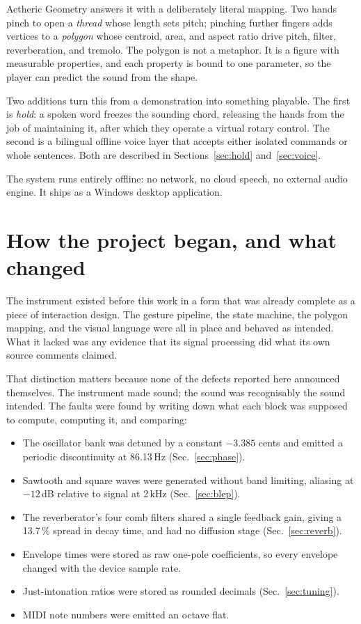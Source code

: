 \documentclass[a4paper,11pt]{article}
\begin{document}
Aetheric Geometry answers it with a deliberately literal mapping. Two hands
pinch to open a \emph{thread} whose length sets pitch; pinching further fingers
adds vertices to a \emph{polygon} whose centroid, area, and aspect ratio drive
pitch, filter, reverberation, and tremolo. The polygon is not a metaphor. It
is a figure with measurable properties, and each property is bound to one
parameter, so the player can predict the sound from the shape.

Two additions turn this from a demonstration into something playable. The first
is \emph{hold}: a spoken word freezes the sounding chord, releasing the hands
from the job of maintaining it, after which they operate a virtual rotary
control. The second is a bilingual offline voice layer that accepts either
isolated commands or whole sentences. Both are described in
Sections~\ref{sec:hold} and~\ref{sec:voice}.

The system runs entirely offline: no network, no cloud speech, no external
audio engine. It ships as a Windows desktop application.

\section{How the project began, and what changed}

The instrument existed before this work in a form that was already complete as
a piece of interaction design. The gesture pipeline, the state machine, the
polygon mapping, and the visual language were all in place and behaved as
intended. What it lacked was any evidence that its signal processing did what
its own source comments claimed.

That distinction matters because none of the defects reported here announced
themselves. The instrument made sound; the sound was recognisably the sound
intended. The faults were found by writing down what each block was supposed to
compute, computing it, and comparing:

\begin{itemize}\itemsep2pt
\item The oscillator bank was detuned by a constant $-3.385$ cents and emitted a
      periodic discontinuity at 86.13\,Hz (Sec.~\ref{sec:phase}).
\item Sawtooth and square waves were generated without band limiting, aliasing
      at $-12$\,dB relative to signal at 2\,kHz (Sec.~\ref{sec:blep}).
\item The reverberator's four comb filters shared a single feedback gain,
      giving a 13.7\,\% spread in decay time, and had no diffusion stage
      (Sec.~\ref{sec:reverb}).
\item Envelope times were stored as raw one-pole coefficients, so every
      envelope changed with the device sample rate.
\item Just-intonation ratios were stored as rounded decimals
      (Sec.~\ref{sec:tuning}).
\item MIDI note numbers were emitted an octave flat.
\end{itemize}
\end{document}
